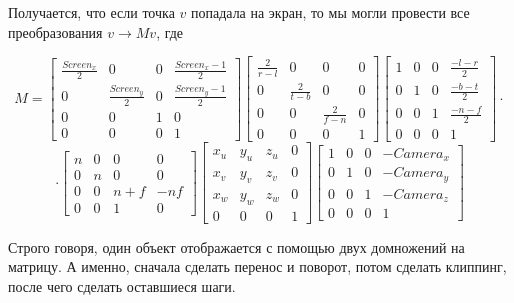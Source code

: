\documentclass{article}
\begin{document}
Получается, что если точка $v$ попадала на экран, то мы могли провести все преобразования $v \to Mv$, где

$$M = \begin{bmatrix}\frac{Screen_x}{2} & 0 & 0 & \frac{Screen_x - 1}{2} \\ 
					  0 & \frac{Screen_y}{2} & 0 & \frac{Screen_y - 1}{2} \\
					  0 & 0 & 1 & 0 \\
					  0 & 0 & 0 & 1\end{bmatrix}\begin{bmatrix}
					  \frac{2}{r - l} & 0 & 0 & 0 \\ 
					  0 & \frac{2}{t - b} & 0 & 0 \\
					  0 & 0 & \frac{2}{f - n} & 0 \\
					  0 & 0 & 0 & 1\end{bmatrix}\begin{bmatrix}
					  1 & 0 & 0 & \frac{-l - r}{2} \\ 
					  0 & 1 & 0 & \frac{-b - t}{2} \\
					  0 & 0 & 1 & \frac{-n - f}{2} \\
					  0 & 0 & 0 & 1\end{bmatrix} \cdot $$$$\cdot \begin{bmatrix}
					  n & 0 & 0 & 0 \\
					  0 & n & 0 & 0 \\
					  0 & 0 & n + f & -nf \\
					  0 & 0 & 1 & 0
					  \end{bmatrix}\begin{bmatrix}
					  x_u & y_u & z_u & 0 \\
					  x_v & y_v & z_v & 0 \\
					  x_w & y_w & z_w & 0 \\
					  0 & 0 & 0 & 1
					  \end{bmatrix}\begin{bmatrix}
					  1 & 0 & 0 & -Camera_x \\
					  0 & 1 & 0 & -Camera_y \\
					  0 & 0 & 1 & -Camera_z \\
					  0 & 0 & 0 & 1
					  \end{bmatrix}$$

Строго говоря, один объект отображается с помощью двух домножений на матрицу. А именно, сначала сделать перенос и поворот, потом сделать клиппинг, после чего сделать оставшиеся шаги.
\end{document}
